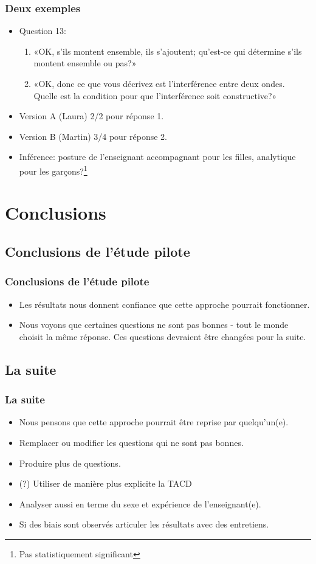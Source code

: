 \documentclass{beamer}
\begin{document}
\begin{frame}
  \frametitle{Deux exemples}
  \begin{itemize}
  \item Question 13:
    \begin{enumerate}
    \item «OK, s’ils montent ensemble, ils s’ajoutent; qu’est-ce qui détermine
      s’ils montent ensemble ou pas?»
    \item «OK, donc ce que vous décrivez est l’interférence entre deux ondes.
      Quelle est la condition pour que l’interférence soit constructive?»   
      \end{enumerate}
  \item Version A (Laura) 2/2 pour réponse 1.
  \item Version B (Martin) 3/4 pour réponse 2.
  \item Inférence: posture de l'enseignant accompagnant pour les filles,
    analytique pour les garçons?\footnote{Pas statistiquement significant} 
  \end{itemize}
\end{frame}


\section{Conclusions}
\subsection{Conclusions de l'étude pilote}
\begin{frame}
\frametitle{Conclusions de l'étude pilote}
  \begin{itemize}
  \item Les résultats nous donnent confiance que cette approche pourrait fonctionner.
  \item Nous voyons que certaines questions ne sont pas bonnes - tout le monde
    choisit la même réponse. Ces questions devraient être changées pour la suite.
  \end{itemize}
\end{frame}

\subsection{La suite}
\begin{frame}
  \frametitle{La suite}
  \begin{itemize}
  \item Nous pensons que cette approche pourrait être reprise par quelqu'un(e).
  \item Remplacer ou modifier les questions qui ne sont pas bonnes.
  \item Produire plus de questions.
    \item (?) Utiliser de manière plus explicite la TACD
  \item Analyser aussi en terme du sexe et expérience de l'enseignant(e).
    \item Si des biais sont observés articuler les résultats avec des entretiens.
  \end{itemize}
\end{frame}
\end{document}
